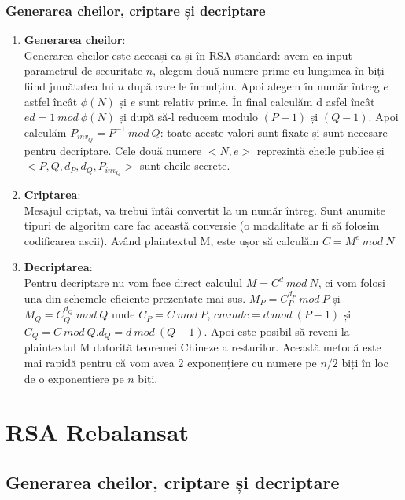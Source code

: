 \documentclass[12]{report}
\begin{document}
	  \subsubsection{Generarea cheilor, criptare și decriptare}
	  \begin{enumerate}
	    \item \textbf{Generarea cheilor}: \\
	    Generarea cheilor este aceeași ca și în RSA standard: avem ca input parametrul de securitate $n$, alegem două numere prime cu lungimea în biți fiind jumătatea lui $n$ după care le înmulțim. Apoi alegem în număr întreg $e$ astfel încât $ \phi(N) $ și $e$ sunt relativ prime. În final calculăm d asfel încât $ ed=1 \ mod \ \phi(N)$ și după să-l reducem modulo $(P-1)$ și $(Q-1)$. Apoi calculăm $P_{inv_Q} = P^{-1} \ mod \ Q$: toate aceste valori sunt fixate și sunt necesare pentru decriptare. Cele două numere $<N,e>$ reprezintă cheile publice și $<P,Q,d_P,d_Q,P_{inv_Q}>$ sunt cheile secrete.
	    
	    \item \textbf{ Criptarea}: \\
	    Mesajul criptat, va trebui întâi convertit la un număr întreg. Sunt anumite tipuri de algoritm care fac această conversie (o modalitate ar fi să folosim codificarea ascii). Având plaintextul M, este ușor să calculăm $C = M^e \ mod \ N$
	    
	    \item \textbf{Decriptarea}: \\
	    Pentru decriptare nu vom face direct calculul $M=C^d \ mod \ N$, ci vom folosi una din schemele eficiente prezentate mai sus. $M_P= C_{P}^{d_P} \ mod \ P$ și $M_Q = C_{Q}^{d_Q} \ mod \ Q $ unde $C_P = C \ mod \ P$, $cmmdc= d \ mod \ (P-1) $ și $C_Q = C \ mod \ Q. d_Q = d \ mod \ (Q-1) $. Apoi este posibil să reveni la plaintextul M datorită teoremei Chineze a resturilor. Această metodă este mai rapidă pentru că vom avea 2 exponențiere cu numere pe $n/2$ biți în loc de o exponențiere pe $n$ biți.
	  \end{enumerate}
	  
	  \section{RSA Rebalansat}
	   \subsection{Generarea cheilor, criptare și decriptare}
\end{document}

